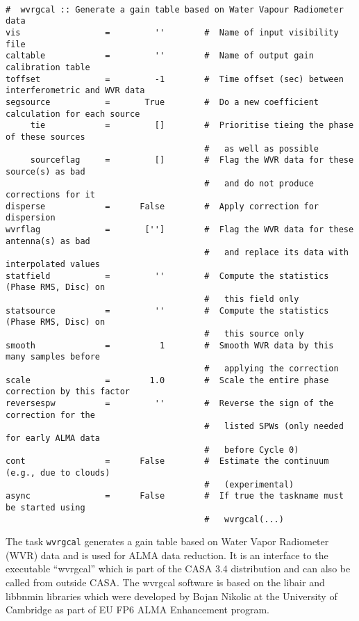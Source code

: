 \small
\begin{verbatim}

#  wvrgcal :: Generate a gain table based on Water Vapour Radiometer data
vis                 =         ''        #  Name of input visibility file
caltable            =         ''        #  Name of output gain calibration table
toffset             =         -1        #  Time offset (sec) between interferometric and WVR data
segsource           =       True        #  Do a new coefficient calculation for each source
     tie            =         []        #  Prioritise tieing the phase of these sources
                                        #   as well as possible 
     sourceflag     =         []        #  Flag the WVR data for these source(s) as bad
                                        #   and do not produce corrections for it
disperse            =      False        #  Apply correction for dispersion
wvrflag             =       ['']        #  Flag the WVR data for these antenna(s) as bad
                                        #   and replace its data with interpolated values
statfield           =         ''        #  Compute the statistics (Phase RMS, Disc) on
                                        #   this field only
statsource          =         ''        #  Compute the statistics (Phase RMS, Disc) on
                                        #   this source only
smooth              =          1        #  Smooth WVR data by this many samples before
                                        #   applying the correction
scale               =        1.0        #  Scale the entire phase correction by this factor
reversespw          =         ''        #  Reverse the sign of the correction for the
                                        #   listed SPWs (only needed for early ALMA data
                                        #   before Cycle 0)
cont                =      False        #  Estimate the continuum (e.g., due to clouds)
                                        #   (experimental)
async               =      False        #  If true the taskname must be started using
                                        #   wvrgcal(...)
\end{verbatim}
\normalsize

The task {\tt wvrgcal} generates a gain table based on Water Vapor
Radiometer (WVR) data and is used for ALMA data reduction. It is an interface to the executable
``wvrgcal'' which is part of the CASA 3.4 distribution and can also be called from outside
CASA. The wvrgcal software is based on the libair and libbnmin libraries which were developed
by Bojan Nikolic at the University of Cambridge as part of EU FP6 ALMA Enhancement program.

